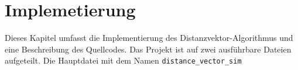 \chapter{Implemetierung}
Dieses Kapitel umfasst die Implementierung des Distanzvektor-Algorithmus und eine Beschreibung des Quellcodes. Das Projekt ist auf zwei ausführbare Dateien aufgeteilt. Die Hauptdatei mit dem Namen \texttt{distance_vector_sim}